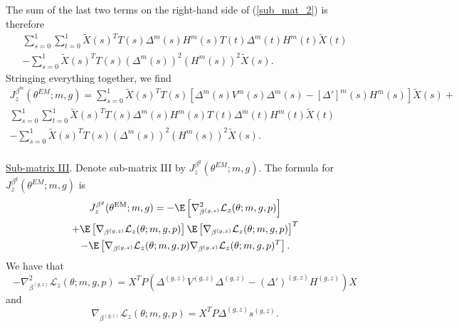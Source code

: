\documentclass[12pt]{article}
\begin{document}
The sum of the last two terms on the right-hand side of (\ref{sub_mat_2}) is therefore
\begin{multline*} \sum_{s=0}^1 \sum_{t=0}^1 \tilde{X}(s)^T {T}(s) {\Delta}^m(s) {H}^m(s) {T}(t) {\Delta}^m(t) {H}^m(t) \tilde{X}(t) \\ - \sum_{s=0}^1 \tilde{X}(s)^T {T}(s) ({\Delta}^m(s))^2 ({H}^m(s))^2 \tilde{X}(s). \end{multline*}
Stringing everything together, we find
\begin{multline}\label{sub_mat_2_formula}
J_z^{\beta^m}(\theta^{EM}; m, g) = \sum_{s=0}^1 \tilde{X}(s)^T T(s) \left[ {\Delta}^m(s) {V}^m(s) {\Delta}^m(s) - [{\Delta}']^m(s) {H}^m(s) \right] \tilde{X}(s) + \\ \sum_{s=0}^1 \sum_{t=0}^1 \tilde{X}(s)^T {T}(s) {\Delta}^m(s) {H}^m(s) {T}(t) {\Delta}^m(t) {H}^m(t) \tilde{X}(t) \\ - \sum_{s=0}^1 \tilde{X}(s)^T {T}(s) ({\Delta}^m(s))^2 ({H}^m(s))^2 \tilde{X}(s).
\end{multline}
\\
\noindent \underline{Sub-matrix III}. Denote sub-matrix III by $J_z^{\beta^g}(\theta^{EM}; m, g).$ The formula for $J_z^{\beta^g}(\theta^{EM}; m, g)$ is
\begin{multline}\label{sub_mat_3}
J^{\beta^g}_z(\theta^\textrm{EM}; m, g) = -\E \left[\nabla_{\beta^{(g,z)}}^2 \mathcal{L}_z(\theta; m, g, p) \right] \\ + \E\left[ \nabla_{\beta^{(g,z)}} \mathcal{L}_z(\theta; m, g, p) \right] \E\left[\nabla_{\beta^{(g,z)}} \mathcal{L}_z(\theta; m, g, p) \right]^T \\ - \E\left[ \nabla_{\beta^{(g,z)}} \mathcal{L}_z(\theta; m, g, p) \nabla_{\beta^{(g,z)}} \mathcal{L}_z(\theta; m, g, p)^T \right].
\end{multline}
We have that
$$ -\nabla_{\beta^{(g,z)}}^2 \mathcal{L}_z(\theta; m, g, p) =  X^T P ( \Delta^{(g,z)}V^{(g,z)}\Delta^{(g,z)} - (\Delta')^{(g,z)} H^{(g,z)}) X$$ and
$$ \nabla_{\beta^{(g,z)}} \mathcal{L}_z(\theta; m, g, p) = X^T P \Delta^{(g,z)} s^{(g,z)}.$$
\end{document}
